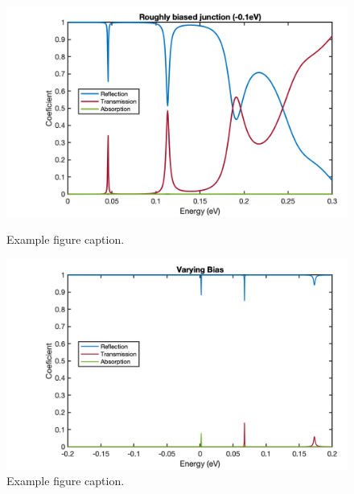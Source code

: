\documentclass[twocolumn]{article}
\begin{document}
\begin{figure}[h]
    \centering
    \includegraphics[width=0.8\linewidth]{roughly_biased_junction_spectra(-0.1eV).png}
    \caption{Example figure caption.}
    \label{fig:example-7}
    \centering
    \includegraphics[width=0.8\linewidth]{varying_bias.png}
    \caption{Example figure caption.}
    \label{fig:example-8}
\end{figure}
\end{document}

